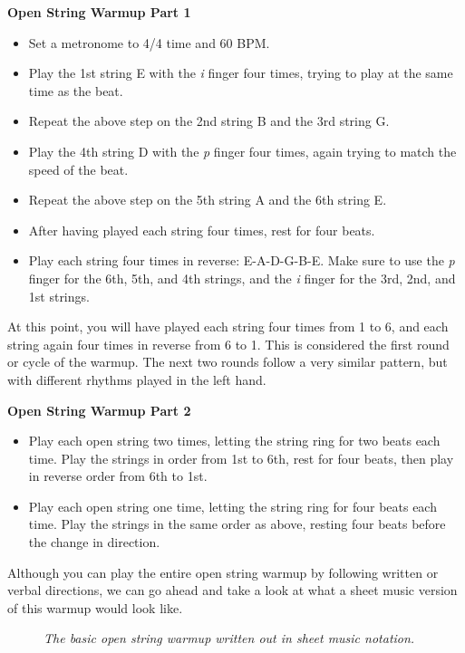 \noindent \textbf{Open String Warmup Part 1}
\begin{itemize}
	\item Set a metronome to 4/4 time and 60 BPM.
	\item Play the 1st string E with the \textit{i} finger four times, trying to play at the same time as the beat.
	\item Repeat the above step on the 2nd string B and the 3rd string G.
	\item Play the 4th string D with the \textit{p} finger four times, again trying to match the speed of the beat.
	\item Repeat the above step on the 5th string A and the 6th string E.
	\item After having played each string four times, rest for four beats.
	\item Play each string four times in reverse: E-A-D-G-B-E. Make sure to use the \textit{p} finger for the 6th, 5th, and 4th strings, and the \textit{i} finger for the 3rd, 2nd, and 1st strings.
\end{itemize}

At this point, you will have played each string four times from 1 to 6, and each string again four times in reverse from 6 to 1. This is considered the first round or cycle of the warmup. The next two rounds follow a very similar pattern, but with different rhythms played in the left hand.

\newpage

\noindent \textbf{Open String Warmup Part 2}
\begin{itemize}
	\item Play each open string two times, letting the string ring for two beats each time. Play the strings in order from 1st to 6th, rest for four beats, then play in reverse order from 6th to 1st.
	\item Play each open string one time, letting the string ring for four beats each time. Play the strings in the same order as above, resting four beats before the change in direction.
\end{itemize}

Although you can play the entire open string warmup by following written or verbal directions, we can go ahead and take a look at what a sheet music version of this warmup would look like.

\begin{figure}
	\begin{center}
		\caption{\textit{The basic open string warmup written out in sheet music notation.}}
	\end{center}
\end{figure}